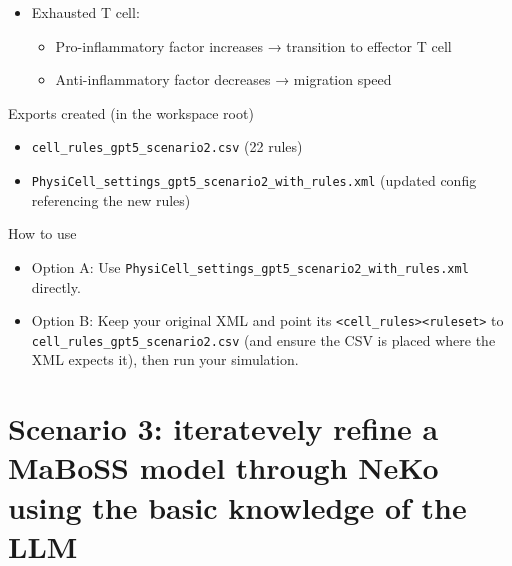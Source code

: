 \begin{itemize}
  \begin{itemize}
  \tightlist
  \item
    Contact with malignant epithelial cell increases → attack malignant
    epithelial cell
  \item
    Pro-inflammatory factor increases / anti-inflammatory factor
    decreases → attack malignant epithelial cell
  \item
    Pro-inflammatory factor increases → migration speed
  \item
    Anti-inflammatory factor increases → transition to exhausted T cell
  \end{itemize}
\item
  Exhausted T cell:

  \begin{itemize}
  \tightlist
  \item
    Pro-inflammatory factor increases → transition to effector T cell
  \item
    Anti-inflammatory factor decreases → migration speed
  \end{itemize}
\end{itemize}

Exports created (in the workspace root)

\begin{itemize}
\tightlist
\item
  \texttt{cell\_rules\_gpt5\_scenario2.csv} (22 rules)
\item
  \texttt{PhysiCell\_settings\_gpt5\_scenario2\_with\_rules.xml}
  (updated config referencing the new rules)
\end{itemize}

How to use

\begin{itemize}
\tightlist
\item
  Option A: Use
  \texttt{PhysiCell\_settings\_gpt5\_scenario2\_with\_rules.xml}
  directly.
\item
  Option B: Keep your original XML and point its
  \texttt{\textless{}cell\_rules\textgreater{}\textless{}ruleset\textgreater{}}
  to \texttt{cell\_rules\_gpt5\_scenario2.csv} (and ensure the CSV is
  placed where the XML expects it), then run your simulation.
\end{itemize}

\hypertarget{scenario-3-iteratevely-refine-a-maboss-model-through-neko-using-the-basic-knowledge-of-the-llm}{%
\section{Scenario 3: iteratevely refine a MaBoSS model through NeKo
using the basic knowledge of the
LLM}\label{scenario-3-iteratevely-refine-a-maboss-model-through-neko-using-the-basic-knowledge-of-the-llm}}

